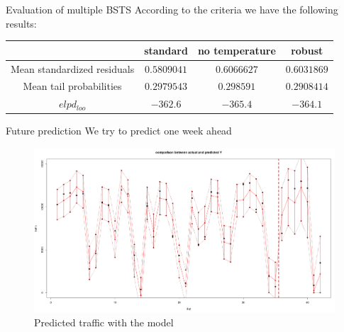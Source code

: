 \documentclass{beamer}
\begin{document}
\begin{frame}{Evaluation of multiple  BSTS}
According to the criteria we have the following \alert{results}:
\tiny
\begin{table}[!htb]
	\centering
	\begin{tabular}{|c|c|c|c|}
		\hline
		& standard & no temperature & robust \\
		\hline
		Mean standardized residuals &$  0.5809041 $ & $  0.6066627 $ &$  0.6031869 $\\
		\hline
		Mean tail probabilities &$ 0.2979543 $ & $  0.298591 $ &$  0.2908414 $\\
		\hline
		$ elpd_{loo} $ &$ -362.6 $ & $  -365.4 $ &$  -364.1 $\\
		\hline
	\end{tabular}
\end{table}
\end{frame}

\begin{frame}{Future prediction}
We try to predict  \alert{one week ahead}
\begin{figure}[H]
	\centering
\includegraphics[width=100 mm]{pictures/predicted_traffic.png}
\caption{Predicted traffic with the model}
\label{fig:pt}
\end{figure}
\end{frame}
\end{document}
